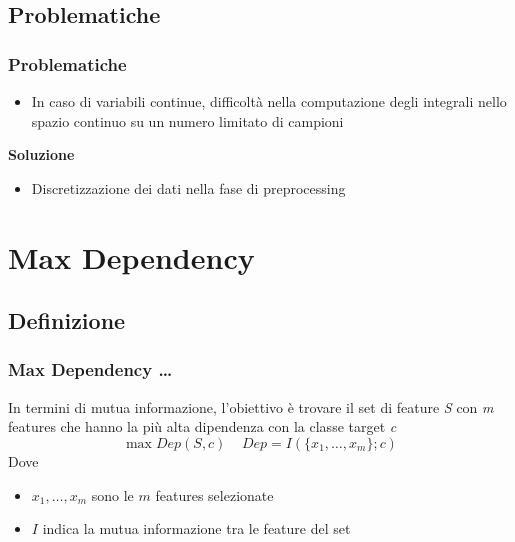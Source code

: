\documentclass{beamer}
\begin{document}
\subsection{Problematiche}
\begin{frame}
	\frametitle{Problematiche}
	\begin{itemize}
		\item In caso di variabili continue, difficoltà nella computazione degli integrali nello spazio continuo su un numero limitato di campioni
	\end{itemize}
	\textbf{Soluzione}
	\begin{itemize}
		\item Discretizzazione dei dati nella fase di preprocessing
	\end{itemize}
\end{frame}


\section{Max Dependency}
\subsection{Definizione}
\begin{frame}
	\frametitle{Max Dependency \dots}
	In termini di mutua informazione, l'obiettivo è trovare il set di feature \emph{S} con \emph{m} features che hanno la più alta dipendenza con la classe target \emph{c}
	$$ \max Dep(S,c)~~~~~ Dep = I(\{x_1,\dots,x_m \};c )$$
	Dove 
	\begin{itemize}
		\item $x_1,\dots,x_m$ sono le $m$ features selezionate
		\item $I$ indica la mutua informazione tra le feature del set
	\end{itemize}
\end{frame}
\end{document}
